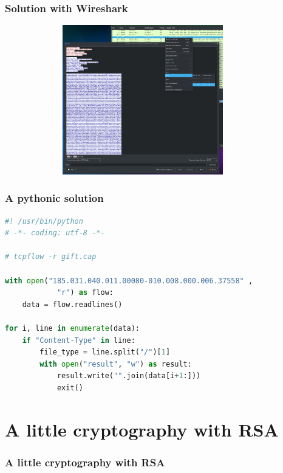 \documentclass[]{beamer}
\begin{document}
\begin{frame}
\frametitle{Solution with Wireshark}
\begin{center}
    \includegraphics[height=6.5cm, width=12.0cm]{./images/Wireshark_follow_http_stream.png}
\end{center}
\end{frame}
 


\begin{frame}[fragile]
\frametitle{A pythonic solution}
\begin{lstlisting}[language=Python]
#! /usr/bin/python
# -*- coding: utf-8 -*-

# tcpflow -r gift.cap

with open("185.031.040.011.00080-010.008.000.006.37558" ,
            "r") as flow:
    data = flow.readlines()

for i, line in enumerate(data):
    if "Content-Type" in line:
        file_type = line.split("/")[1]
        with open("result", "w") as result:
            result.write("".join(data[i+1:]))
            exit()
\end{lstlisting}
\end{frame}
 


 

 
 

 
%
%
\section{A little cryptography with RSA}
\begin{frame}
    \frametitle{A little cryptography with RSA}
    \begin{columns}[t]
        \begin{column}{5cm}
            \tableofcontents[sections={1-3}, currentsection, hideothersubsections]
        \end{column}
        \begin{column}{5cm}
            \tableofcontents[sections={4-5}, currentsection, hideothersubsections]
        \end{column}
    \end{columns}
\end{frame}
\end{document}

